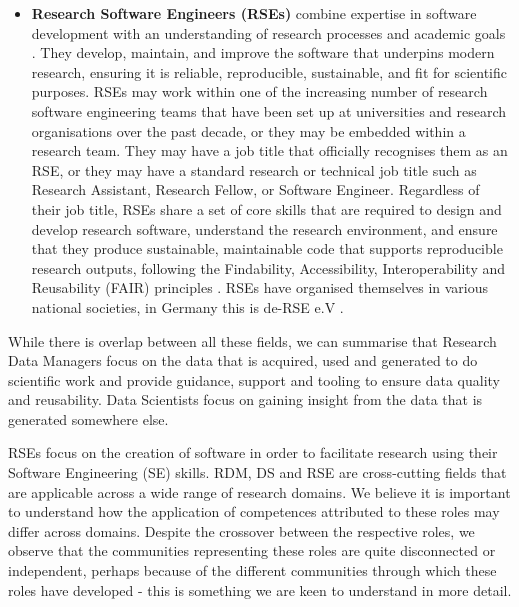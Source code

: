 \documentclass[
        english,biblatex
    ]{lni}
\providecommand{\tightlist}{%
    \setlength{\itemsep}{0pt}\setlength{\parskip}{0pt}}
\begin{document}
    \begin{itemize}
    \tightlist
    \item
      \textbf{Research Software Engineers (RSEs)} combine expertise in
      software development with an understanding of research processes
      and academic goals \autocite{zenodo495360}. They develop,
      maintain, and improve the software that underpins modern research,
      ensuring it is reliable, reproducible, sustainable, and fit for
      scientific purposes. RSEs may work within one of the increasing
      number of research software engineering teams that have been set
      up at universities and research organisations over the past
      decade, or they may be embedded within a research team. They may
      have a job title that officially recognises them as an RSE, or
      they may have a standard research or technical job title such as
      Research Assistant, Research Fellow, or Software Engineer.
      Regardless of their job title, RSEs share a set of core skills
      that are required to design and develop research software,
      understand the research environment, and ensure that they produce
      sustainable, maintainable code that supports reproducible research
      outputs, following the Findability, Accessibility,
      Interoperability and Reusability (FAIR) principles
      \autocite{Goth2024RSE}. RSEs have organised themselves in various
      national societies, in Germany this is de-RSE e.V
      \autocite{derseev}.
    \end{itemize}

    While there is overlap between all these fields, we can summarise
    that Research Data Managers focus on the data that is acquired, used
    and generated to do scientific work and provide guidance, support
    and tooling to ensure data quality and reusability. Data Scientists
    focus on gaining insight from the data that is generated somewhere
    else.

    RSEs focus on the creation of software in order to facilitate
    research using their Software Engineering (SE) skills. RDM, DS and
    RSE are cross-cutting fields that are applicable across a wide range
    of research domains. We believe it is important to understand how
    the application of competences attributed to these roles may differ
    across domains. Despite the crossover between the respective roles,
    we observe that the communities representing these roles are quite
    disconnected or independent, perhaps because of the different
    communities through which these roles have developed - this is
    something we are keen to understand in more detail.
\end{document}

